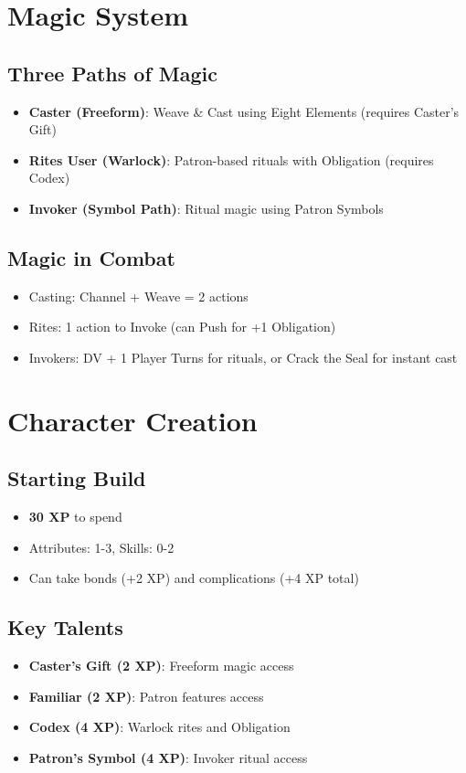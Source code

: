 \documentclass[11pt]{article}
\begin{document}
\section{Magic System}

\subsection{Three Paths of Magic}
\begin{itemize}
    \item \textbf{Caster (Freeform)}: Weave \& Cast using Eight Elements (requires Caster's Gift)
    \item \textbf{Rites User (Warlock)}: Patron-based rituals with Obligation (requires Codex)
    \item \textbf{Invoker (Symbol Path)}: Ritual magic using Patron Symbols
\end{itemize}

\subsection{Magic in Combat}
\begin{itemize}
    \item Casting: Channel + Weave = 2 actions
    \item Rites: 1 action to Invoke (can Push for +1 Obligation)
    \item Invokers: DV + 1 Player Turns for rituals, or Crack the Seal for instant cast
\end{itemize}

\section{Character Creation}

\subsection{Starting Build}
\begin{itemize}
    \item \textbf{30 XP} to spend
    \item Attributes: 1-3, Skills: 0-2
    \item Can take bonds (+2 XP) and complications (+4 XP total)
\end{itemize}

\subsection{Key Talents}
\begin{itemize}
    \item \textbf{Caster's Gift (2 XP)}: Freeform magic access
    \item \textbf{Familiar (2 XP)}: Patron features access
    \item \textbf{Codex (4 XP)}: Warlock rites and Obligation
    \item \textbf{Patron's Symbol (4 XP)}: Invoker ritual access
\end{itemize}
\end{document}
